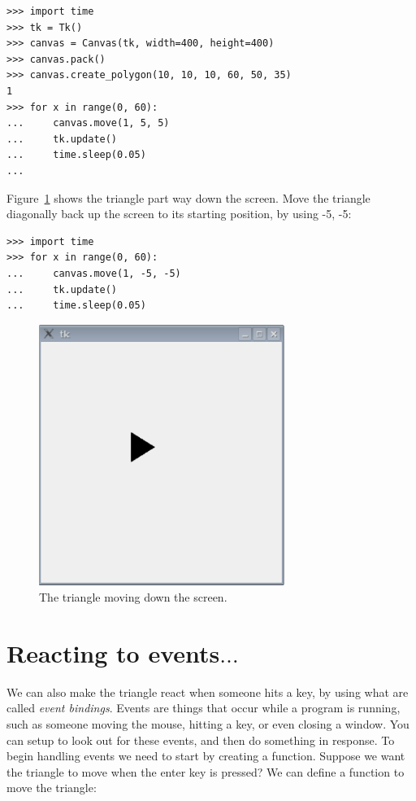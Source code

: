 \begin{Verbatim}[frame=single]
>>> import time
>>> tk = Tk()
>>> canvas = Canvas(tk, width=400, height=400)
>>> canvas.pack()
>>> canvas.create_polygon(10, 10, 10, 60, 50, 35)
1
>>> for x in range(0, 60):
...     canvas.move(1, 5, 5)
...     tk.update()
...     time.sleep(0.05)
...
\end{Verbatim}

Figure~\ref{fig45} shows the triangle part way down the screen. Move the triangle diagonally back up the screen to its starting position, by using -5, -5:

\begin{Verbatim}[frame=single]
>>> import time
>>> for x in range(0, 60):
...     canvas.move(1, -5, -5)
...     tk.update()
...     time.sleep(0.05)
\end{Verbatim}

\begin{figure}
\begin{center}
\includegraphics[width=80mm]{images/figure45}
\end{center}
\caption{The triangle moving down the screen.}\label{fig45}
\end{figure}

\section{Reacting to events$\ldots$}

We can also make the triangle react when someone hits a key, by using what are called \emph{event bindings}.  Events are things that occur while a program is running, such as someone moving the mouse, hitting a key, or even closing a window. You can setup  to look out for these events, and then do something in response. To begin handling events we need to start by creating a function. Suppose we want the triangle to move when the enter key is pressed? We can define a function to move the triangle:

